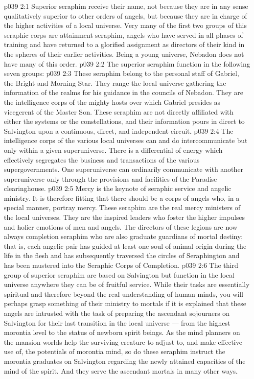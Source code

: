 \vs p039 2:1 Superior seraphim receive their name, not because they are in any sense qualitatively superior to other orders of angels, but because they are in charge of the higher activities of a local universe. Very many of the first two groups of this seraphic corps are attainment seraphim, angels who have served in all phases of training and have returned to a glorified assignment as directors of their kind in the spheres of their earlier activities. Being a young universe, Nebadon does not have many of this order.
\vs p039 2:2 The superior seraphim function in the following seven groups:
\vs p039 2:3 \bibnobreakspace {} These seraphim belong to the personal staff of Gabriel, the Bright and Morning Star. They range the local universe gathering the information of the realms for his guidance in the councils of Nebadon. They are the intelligence corps of the mighty hosts over which Gabriel presides as vicegerent of the Master Son. These seraphim are not directly affiliated with either the systems or the constellations, and their information pours in direct to Salvington upon a continuous, direct, and independent circuit.
\vs p039 2:4 The intelligence corps of the various local universes can and do intercommunicate but only within a given superuniverse. There is a differential of energy which effectively segregates the business and transactions of the various supergovernments. One superuniverse can ordinarily communicate with another superuniverse only through the provisions and facilities of the Paradise clearinghouse.
\vs p039 2:5 \pc {}\bibnobreakspace {} Mercy is the keynote of seraphic service and angelic ministry. It is therefore fitting that there should be a corps of angels who, in a special manner, portray mercy. These seraphim are the real mercy ministers of the local universes. They are the inspired leaders who foster the higher impulses and holier emotions of men and angels. The directors of these legions are now always completion seraphim who are also graduate guardians of mortal destiny; that is, each angelic pair has guided at least one soul of animal origin during the life in the flesh and has subsequently traversed the circles of Seraphington and has been mustered into the Seraphic Corps of Completion.
\vs p039 2:6 \pc {}\bibnobreakspace {} The third group of superior seraphim are based on Salvington but function in the local universe anywhere they can be of fruitful service. While their tasks are essentially spiritual and therefore beyond the real understanding of human minds, you will perhaps grasp something of their ministry to mortals if it is explained that these angels are intrusted with the task of preparing the ascendant sojourners on Salvington for their last transition in the local universe --- from the highest morontia level to the status of newborn spirit beings. As the mind planners on the mansion worlds help the surviving creature to adjust to, and make effective use of, the potentials of morontia mind, so do these seraphim instruct the morontia graduates on Salvington regarding the newly attained capacities of the mind of the spirit. And they serve the ascendant mortals in many other ways.
